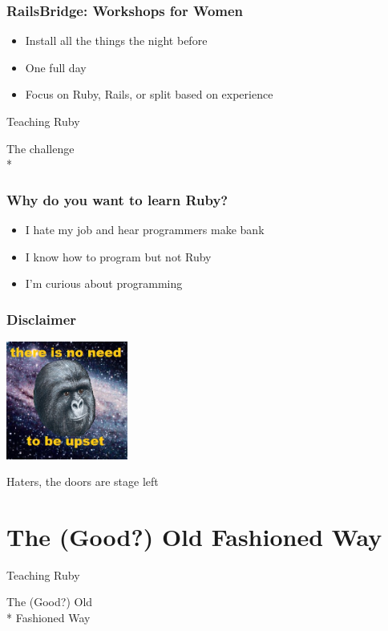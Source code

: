 \documentclass[20pt]{beamer}
\begin{document}
\begin{frame}
	\frametitle{RailsBridge: Workshops for Women}
	\begin{itemize}
		\item Install all the things the night before
		\item One full day
		\item Focus on Ruby, Rails, or split based on experience
	\end{itemize}
\end{frame}

\begin{frame}
	\par { Teaching Ruby}\par
	\vspace{3cm}\hfill
	{The challenge \\*}
\end{frame}

\begin{frame}
	\frametitle{Why do you want to learn Ruby?}
	\begin{itemize}
		\item I hate my job and hear programmers make bank
		\item I know how to program but not Ruby
		\item I'm curious about programming
	\end{itemize}
\end{frame}

\begin{frame}
	\frametitle{Disclaimer}
	\centering \includegraphics[width=4cm]{gorilla}\par
  { Haters, the doors are stage left }
\end{frame}

\section{The (Good?) Old Fashioned Way}
\begin{frame}
	\par { Teaching Ruby}\par
	\vspace{3cm}\hfill
	{The (Good?) Old\\* \hfill Fashioned Way}
\end{frame}
\end{document}
